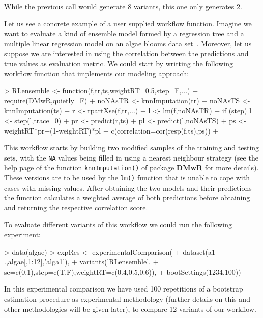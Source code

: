 \documentclass[10pt,a4paper]{article}
\begin{document}
While the previous call would generate 8 variants, this one only generates 2.

Let us see a concrete example of a user supplied workflow
function. Imagine we want to evaluate a kind of ensemble model formed
by a regression tree and a multiple linear regression model on an
algae blooms data set~\cite{Tor10}. Moreover, let us suppose we are
interested in using the correlation between the predictions and true
values as evaluation metric. We could start by writting the following
workflow function that implements our modeling approach:

\begin{Schunk}
\begin{Sinput}
> RLensemble <- function(f,tr,ts,weightRT=0.5,step=F,...) {
+   require(DMwR,quietly=F)
+   noNAsTR <- knnImputation(tr)
+   noNAsTS <- knnImputation(ts)
+   r <- rpartXse(f,tr,...)
+   l <- lm(f,noNAsTR)
+   if (step) l <- step(l,trace=0)
+   pr <- predict(r,ts)
+   pl <- predict(l,noNAsTS)
+   ps <- weightRT*pr+(1-weightRT)*pl
+   c(correlation=cor(resp(f,ts),ps))
+ }
\end{Sinput}
\end{Schunk}

This workflow starts by building two modified samples of the training
and testing sets, with the \texttt{NA} values being filled in using a
nearest neighbour strategy (see the help page of the function
\texttt{knnImputation()} of package \textbf{DMwR} for more
details). These versions are to be used by the \texttt{lm()} function
that is unable to cope with cases with missing values. After obtaining
the two models and their predictions the function calculates a
weighted average of both predictions before obtaining and returning
the respective correlation score.

To evaluate different variants of this workflow we could run the
following experiment:

\begin{Schunk}
\begin{Sinput}
> data(algae)
> expRes <- experimentalComparison(
+   dataset(a1 ~ .,algae[,1:12],'alga1'),
+   variants('RLensemble',
+            se=c(0,1),step=c(T,F),weightRT=c(0.4,0.5,0.6)),
+   bootSettings(1234,100))
\end{Sinput}
\end{Schunk}

In this experimental comparison we have used 100 repetitions of a
bootstrap estimation procedure as experimental methodology (further
details on this and other methodologies will be given later), to
compare 12 variants of our workflow. 
\end{document}
